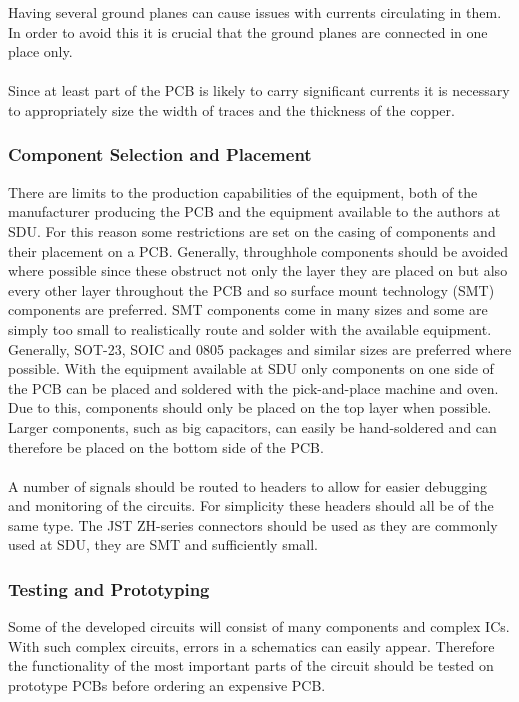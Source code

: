 Having several ground planes can cause issues with currents circulating in them.
In order to avoid this it is crucial that the ground planes are connected in one place only.
\\~\\
Since at least part of the PCB is likely to carry significant currents it is necessary to appropriately size the width of traces and the thickness of the copper.

\subsubsection{Component Selection and Placement} %
\label{ssub:component_case_selection_and_placement}
There are limits to the production capabilities of the equipment, both of the manufacturer producing the PCB and the equipment available to the authors at SDU.
For this reason some restrictions are set on the casing of components and their placement on a PCB.
Generally, throughhole components should be avoided where possible since these obstruct not only the layer they are placed on but also every other layer throughout the PCB and so surface mount technology (SMT) components are preferred.
SMT components come in many sizes and some are simply too small to realistically route and solder with the available equipment.
Generally, SOT-23, SOIC and 0805 packages and similar sizes are preferred where possible.
With the equipment available at SDU only components on one side of the PCB can be placed and soldered with the pick-and-place machine and oven.
Due to this, components should only be placed on the top layer when possible.
Larger components, such as big capacitors, can easily be hand-soldered and can therefore be placed on the bottom side of the PCB.
\\~\\
A number of signals should be routed to headers to allow for easier debugging and monitoring of the circuits.
For simplicity these headers should all be of the same type. 
The JST ZH-series connectors should be used as they are commonly used at SDU, they are SMT and sufficiently small. 


\subsubsection{Testing and Prototyping} %
Some of the developed circuits will consist of many components and complex ICs.
With such complex circuits, errors in a schematics can easily appear.
Therefore the functionality of the most important parts of the circuit should be tested on prototype PCBs before ordering an expensive PCB.

